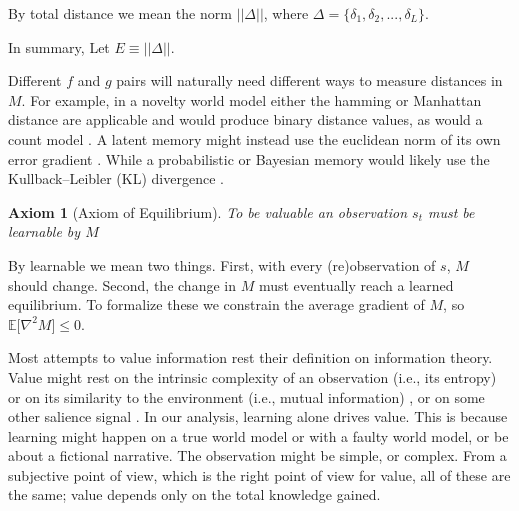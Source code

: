\documentclass[9pt,twocolumn,twoside]{pnas-new}
\newtheorem{axiom}{Axiom}
\begin{document}
By total distance we mean the norm $||\Delta||$, where $\Delta = \{\delta_1, \delta_2,...,\delta_L\}$. 

In summary, Let $E \equiv ||\Delta||$.

Different $f$ and $g$ pairs will naturally need different ways to measure distances in $M$. For example, in a novelty world model \cite{Kakade2002} either the hamming or Manhattan distance are applicable and would produce binary distance values, as would a count model \cite{Bellemare2016,Dayan1993}. A latent memory \cite{Schmidhuber1991,Pathak2017} might instead use the euclidean norm of its own error gradient \cite{Pascanu2013}. While a probabilistic or Bayesian memory would likely use the Kullback–Leibler (KL) divergence \cite{Park2017,Friston2016}.
 
\begin{axiom}
	[Axiom of Equilibrium] To be valuable an observation $s_t$ must be learnable by $M$ 
\label{ax:5} 
\end{axiom}

\noindent By learnable we mean two things. First, with every (re)observation of $s$, $M$ should change. Second, the change in $M$ must eventually reach a learned equilibrium. To formalize these we constrain the average gradient of $M$, so $\mathbb{E}\big [\nabla^2 M \big ] \leq 0$. 

Most attempts to value information rest their definition on information theory. Value might rest on the intrinsic complexity of an observation (i.e., its entropy) \cite{Haarnoja2018} or on its similarity to the environment (i.e., mutual information) \cite{Kolchinsky2018}, or on some other salience signal \cite{Tishby2000}. In our analysis, learning alone drives value. This is because learning might happen on a true world model or with a faulty world model, or be about a fictional narrative. The observation might be simple, or complex. From a subjective point of view, which is the right point of view for value, all of these are the same; value depends only on the total knowledge gained.
\end{document}
